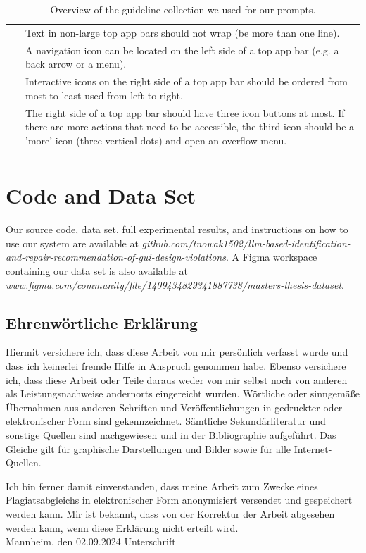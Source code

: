 \documentclass[11pt,titlepage,oneside,openany]{book}
\begin{document}
\begin{longtable}{|p{}|p{}|}
	~ & Text in non-large top app bars should not wrap (be more than one line). \\ 
	~ & A navigation icon can be located on the left side of a top app bar (e.g. a back arrow or a menu). \\ 
	~ & Interactive icons on the right side of a top app bar should be ordered from most to least used from left to right. \\ 
	~ & The right side of a top app bar should have three icon buttons at most. If there are more actions that need to be accessible, the third icon should be a 'more' icon (three vertical dots) and open an overflow menu. \\ \hline
	\caption{Overview of the guideline collection we used for our prompts.}
	\label{tab:guidelines}
\end{longtable}

\chapter{Code and Data Set}
\label{cha:appendix-b}

Our source code, data set, full experimental results, and instructions on how to use our system are available at \emph{github.com/tnowak1502/llm-based-identification-and-repair-recommendation-of-gui-design-violations}. A Figma workspace containing our data set is also available at \linebreak \emph{www.figma.com/community/file/1409434829341887738/masters-thesis-dataset}.

\newpage


\pagestyle{empty}


\section*{Ehrenw\"ortliche Erkl\"arung}
Hiermit versichere ich, dass diese Arbeit von mir persönlich verfasst wurde und dass ich keinerlei fremde Hilfe in Anspruch genommen habe.
Ebenso versichere ich, dass diese Arbeit oder Teile daraus weder von mir selbst noch von anderen als Leistungsnachweise andernorts eingereicht wurden.
W\"ortliche oder sinngem\"aße \"Ubernahmen aus anderen Schriften und Ver\"offentlichungen in gedruckter oder elektronischer Form sind gekennzeichnet.
S\"amtliche Sekund\"arliteratur und sonstige Quellen sind nachgewiesen und in der Bibliographie aufgef\"uhrt. Das Gleiche gilt f\"ur graphische Darstellungen und Bilder sowie f\"ur alle Internet-Quellen.

Ich bin ferner damit einverstanden, dass meine Arbeit zum Zwecke eines Plagiatsabgleichs in elektronischer Form anonymisiert versendet und gespeichert werden kann.
Mir ist bekannt, dass von der Korrektur der Arbeit abgesehen werden kann, wenn diese Erkl\"arung nicht erteilt wird.
\\

\noindent
Mannheim, den 02.09.2024 \hspace{4cm} Unterschrift
\end{document}
